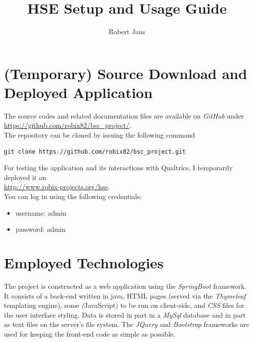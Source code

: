 \documentclass[fleqn]{article}
\title{HSE Setup and Usage Guide}
\author{Robert Jans}
\begin{document}
\setlength{\parindent}{0cm}

\maketitle

\newpage

\hypersetup{
  linkcolor=black
}
\tableofcontents
\hypersetup{
  linkcolor=blue
}

\newpage

\section{(Temporary) Source Download and Deployed Application}

The source codes and related documentation files are available on \emph{GitHub} under \\

\href{https://github.com/robix82/bsc_project/}{https://github.com/robix82/bsc\_project/}. \\

The repository can be cloned by issuing the following command 
\begin{verbatim}
git clone https://github.com/robix82/bsc_project.git
\end{verbatim}

For testing the application and its interactions with Qualtrics, I temporarily deployed it on \\

\url{http://www.robix-projects.org/hse}. \\


You can log in using the following credentials;

\begin{itemize}
\item username: admin
\item password: admin
\end{itemize}

\section{Employed Technologies}

The project is constructed as a web application using the \emph{SpringBoot} framework. It consists of 
a back-end written in java, HTML pages (served via the \emph{Thymeleaf} templating engine), some
\emph(JavaScript) to be run on client-side, and \emph{CSS} files for the user interface styling. 
Data is stored in part in a \emph{MySql} database and in part as text files
on the server's file system. The \emph{JQuery} and \emph{Bootstrap} frameworks are used for keeping the
front-end code as simple as possible.
\end{document}
